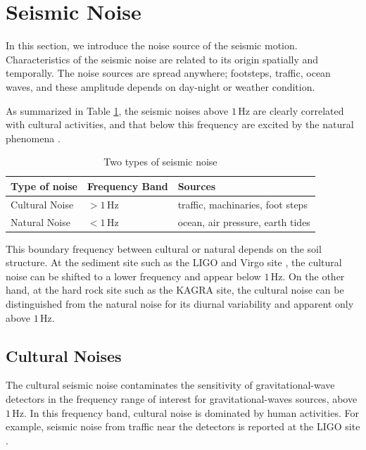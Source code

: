 \newpage
\section{Seismic Noise}\label{sec:32}
In this section, we introduce the noise source of the seismic motion. Characteristics of the seismic noise are related to its origin spatially and temporally. The noise sources are spread anywhere; footsteps, traffic, ocean waves, and these amplitude depends on day-night or weather condition.

As summarized in Table \ref{tb:31}, the seismic noises above $1\,\mathrm{Hz}$ are clearly correlated with cultural activities, and that below this frequency are excited by the natural phenomena \cite{bonnefoy2006nature}.
\begin{table}[h] 
  \begin{center}
    \caption{Two types of seismic noise}\label{tb:31}
    \begin{tabular}{lll} 
      \hline      
      Type of noise & Frequency Band & Sources \\ \hline \hline
      Cultural Noise & $> 1\,\mathrm{Hz}$ & traffic, machinaries, foot steps\\
      Natural Noise  & $< 1\,\mathrm{Hz}$ & ocean, air pressure, earth tides\\
    \end{tabular}
  \end{center}
\end{table}

This boundary frequency between cultural or natural depends on the soil structure. At the sediment site such as the LIGO \cite{Daw_2004} and Virgo site \cite{Beker_2012}, the cultural noise can be shifted to a lower frequency and appear below $1\,\mathrm{Hz}$. On the other hand, at the hard rock site such as the KAGRA site, the cultural noise can be distinguished from the natural noise for its diurnal variability and apparent only above $1\,\mathrm{Hz}$.


\subsection{Cultural Noises} \label{sec:321}
The cultural seismic noise contaminates the sensitivity of gravitational-wave detectors in the frequency range of interest for gravitational-waves sources, above $1\,\mathrm{Hz}$. In this frequency band, cultural noise is dominated by human activities. For example, seismic noise from traffic near the detectors is reported at the LIGO site \cite{schofield2000source}.

